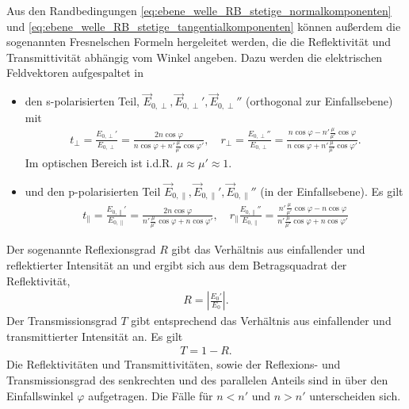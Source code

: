 Aus den Randbedingungen \eqref{eq:ebene_welle_RB_stetige_normalkomponenten} und \eqref{eq:ebene_welle_RB_stetige_tangentialkomponenten} können außerdem die sogenannten Fresnelschen Formeln hergeleitet werden, die die Reflektivität und Transmittivität abhängig vom Winkel angeben.
Dazu werden die elektrischen Feldvektoren aufgespaltet in
\begin{itemize}
    \item den s-polarisierten Teil, $\vec E_{0,\perp},\vec E_{0,\perp}',\vec E_{0,\perp}''$ (orthogonal zur Einfallsebene) mit
          \begin{align}
              \label{eq:fresnel_senkrecht}
              t_\perp = \frac{E_{0,\perp}'}{E_{0,\perp}}=\frac{2n\cos\varphi}{n\cos\varphi+n'\frac{\mu}{\mu'}\cos\varphi'},\quad r_\perp = \frac{E_{0,\perp}''}{E_{0,\perp}}=\frac{n\cos\varphi-n'\frac{\mu}{\mu'}\cos\varphi}{n\cos\varphi+n'\frac{\mu}{\mu'}\cos\varphi'}.
          \end{align}
          Im optischen Bereich ist i.d.R. $\mu\approx\mu'\approx 1$.
    \item und den p-polarisierten Teil $\vec E_{0,\parallel},\vec E_{0,\parallel}',\vec E_{0,\parallel}''$ (in der Einfallsebene). Es gilt
          \begin{align}
              \label{eq:fresnel_parallel}
              t_\parallel = \frac{E_{0,\parallel}'}{E_{0,\parallel}}=\frac{2n\cos\varphi}{n'\frac{\mu}{\mu'}\cos\varphi+n\cos\varphi'},\quad r_\parallel\frac{E_{0,\parallel}''}{E_{0,\parallel}}=\frac{n'\frac{\mu}{\mu'}\cos\varphi-n\cos\varphi}{n'\frac{\mu}{\mu'}\cos\varphi+n\cos\varphi'}
          \end{align}
\end{itemize}

Der sogenannte Reflexionsgrad $R$ gibt das Verhältnis aus einfallender und reflektierter Intensität an und ergibt sich aus dem Betragsquadrat der Reflektivität,
\begin{align*}
    R=\left| \frac{E_0'}{E_0} \right|.
\end{align*}
Der Transmissionsgrad $T$ gibt entsprechend das Verhältnis aus einfallender und transmittierter Intensität an. Es gilt
\begin{align*}
    T=1-R.
\end{align*}
Die Reflektivitäten und Transmittivitäten, sowie der Reflexions- und Transmissionsgrad des senkrechten und des parallelen Anteils sind in 
über den Einfallswinkel $\varphi$ aufgetragen. Die Fälle für $n<n'$ und $n>n'$ unterscheiden sich.

